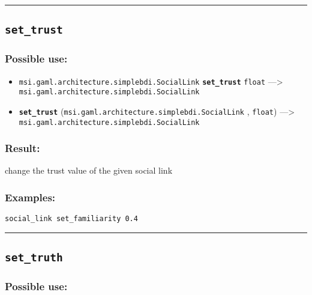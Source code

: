\documentclass[]{book}
\providecommand{\tightlist}{%
  \setlength{\itemsep}{0pt}\setlength{\parskip}{0pt}}
\theoremstyle{definition}
\theoremstyle{definition}
\theoremstyle{definition}
\theoremstyle{remark}
\begin{document}
\begin{center}\rule{0.5\linewidth}{\linethickness}\end{center}

\subsection{\texorpdfstring{\texttt{set\_trust}}{set\_trust}}\label{set_trust}

\subsubsection{Possible use:}\label{possible-use-467}

\begin{itemize}
\tightlist
\item
  \texttt{msi.gaml.architecture.simplebdi.SocialLink}
  \textbf{\texttt{set\_trust}} \texttt{float} ---\textgreater{}
  \texttt{msi.gaml.architecture.simplebdi.SocialLink}
\item
  \textbf{\texttt{set\_trust}}
  (\texttt{msi.gaml.architecture.simplebdi.SocialLink} , \texttt{float})
  ---\textgreater{} \texttt{msi.gaml.architecture.simplebdi.SocialLink}
\end{itemize}

\subsubsection{Result:}\label{result-451}

change the trust value of the given social link

\subsubsection{Examples:}\label{examples-324}

\begin{verbatim}
social_link set_familiarity 0.4 
\end{verbatim}

\begin{center}\rule{0.5\linewidth}{\linethickness}\end{center}

\subsection{\texorpdfstring{\texttt{set\_truth}}{set\_truth}}\label{set_truth}

\subsubsection{Possible use:}\label{possible-use-468}
\end{document}
